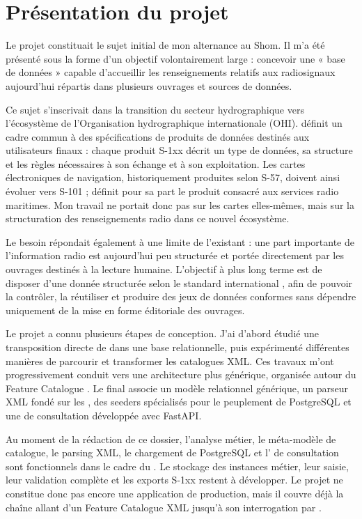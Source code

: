 \section{Présentation du projet}

Le projet  constituait le sujet initial de mon alternance au Shom. Il m'a été présenté sous la forme d'un objectif volontairement large : concevoir une « base de données  » capable d'accueillir les renseignements relatifs aux radiosignaux aujourd'hui répartis dans plusieurs ouvrages et sources de données.

Ce sujet s'inscrivait dans la transition du secteur hydrographique vers l'écosystème  de l'Organisation hydrographique internationale (OHI).  définit un cadre commun à des spécifications de produits de données destinés aux utilisateurs finaux : chaque produit S-1xx décrit un type de données, sa structure et les règles nécessaires à son échange et à son exploitation. Les cartes électroniques de navigation, historiquement produites selon S-57, doivent ainsi évoluer vers S-101 ;  définit pour sa part le produit consacré aux services radio maritimes. Mon travail ne portait donc pas sur les cartes elles-mêmes, mais sur la structuration des renseignements radio dans ce nouvel écosystème.

Le besoin répondait également à une limite de l'existant : une part importante de l'information radio est aujourd'hui peu structurée et portée directement par les ouvrages destinés à la lecture humaine. L'objectif à plus long terme est de disposer d'une donnée structurée selon le standard international , afin de pouvoir la contrôler, la réutiliser et produire des jeux de données conformes sans dépendre uniquement de la mise en forme éditoriale des ouvrages.

Le projet a connu plusieurs étapes de conception. J'ai d'abord étudié une transposition directe de  dans une base relationnelle, puis expérimenté différentes manières de parcourir et transformer les catalogues XML. Ces travaux m'ont progressivement conduit vers une architecture plus générique, organisée autour du Feature Catalogue . Le  final associe un modèle relationnel générique, un parseur XML fondé sur les , des seeders spécialisés pour le peuplement de PostgreSQL et une   de consultation développée avec FastAPI.

Au moment de la rédaction de ce dossier, l'analyse métier, le méta-modèle de catalogue, le parsing XML, le chargement de PostgreSQL et l' de consultation sont fonctionnels dans le cadre du . Le stockage des instances métier, leur saisie, leur validation complète et les exports S-1xx restent à développer. Le projet ne constitue donc pas encore une application de production, mais il couvre déjà la chaîne allant d'un Feature Catalogue XML jusqu'à son interrogation par .

